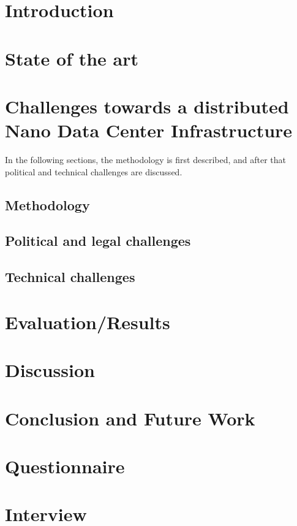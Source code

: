 
\section{Introduction}


\section{State of the art}


\section{Challenges towards a distributed Nano Data Center Infrastructure}
In the following sections, the methodology is first described, and after that political and technical challenges are discussed. 

\subsection{Methodology}



\subsection{Political and legal challenges}


\subsection{Technical challenges}


\section{Evaluation/Results}


\section{Discussion}


\section{Conclusion and Future Work}


\begin{acks}

\end{acks}




\appendix
\section{Questionnaire}

\section{Interview}
